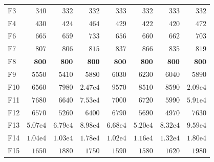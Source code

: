 \begin{tabular}{lrrrrrrr}
F3 & $340$ & $332$ & $332$ & $333$ & $332$ & $333$ & $332$ \\
F4 & $430$ & $424$ & $464$ & $429$ & $422$ & $420$ & $472$ \\
F6 & $665$ & $659$ & $733$ & $656$ & $660$ & $662$ & $703$ \\
F7 & $807$ & $806$ & $815$ & $837$ & $866$ & $835$ & $819$ \\
F8 & $\mathbf{800}$ & $\mathbf{800}$ & $\mathbf{800}$ & $\mathbf{800}$ & $\mathbf{800}$ & $\mathbf{800}$ & $\mathbf{800}$ \\
F9 & $5550$ & $5410$ & $5880$ & $6030$ & $6230$ & $6040$ & $5890$ \\
F10 & $6560$ & $7980$ & $2.47\mathrm{e}{4}$ & $9570$ & $8510$ & $8590$ & $2.09\mathrm{e}{4}$ \\
F11 & $7680$ & $6640$ & $7.53\mathrm{e}{4}$ & $7000$ & $6720$ & $5990$ & $5.91\mathrm{e}{4}$ \\
F12 & $6570$ & $5260$ & $6400$ & $6790$ & $5690$ & $4970$ & $7630$ \\
F13 & $5.07\mathrm{e}{4}$ & $6.79\mathrm{e}{4}$ & $8.98\mathrm{e}{4}$ & $6.68\mathrm{e}{4}$ & $5.20\mathrm{e}{4}$ & $8.32\mathrm{e}{4}$ & $9.59\mathrm{e}{4}$ \\
F14 & $1.04\mathrm{e}{4}$ & $1.03\mathrm{e}{4}$ & $1.78\mathrm{e}{4}$ & $1.02\mathrm{e}{4}$ & $1.16\mathrm{e}{4}$ & $1.32\mathrm{e}{4}$ & $1.80\mathrm{e}{4}$ \\
F15 & $1650$ & $1880$ & $1750$ & $1590$ & $1580$ & $1620$ & $1980$ \\
\bottomrule
\end{tabular}
